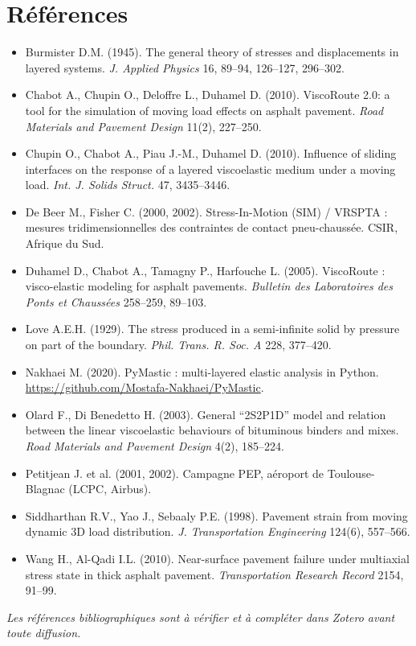 \documentclass[11pt,a4paper]{article}
\begin{document}
\section{Références}
\small
\begin{itemize}[nosep,leftmargin=*]
\item Burmister D.M. (1945). The general theory of stresses and displacements in layered systems. \emph{J. Applied Physics} 16, 89--94, 126--127, 296--302.
\item Chabot A., Chupin O., Deloffre L., Duhamel D. (2010). ViscoRoute 2.0: a tool for the simulation of moving load effects on asphalt pavement. \emph{Road Materials and Pavement Design} 11(2), 227--250.
\item Chupin O., Chabot A., Piau J.-M., Duhamel D. (2010). Influence of sliding interfaces on the response of a layered viscoelastic medium under a moving load. \emph{Int. J. Solids Struct.} 47, 3435--3446.
\item De Beer M., Fisher C. (2000, 2002). Stress-In-Motion (SIM) / VRSPTA : mesures tridimensionnelles des contraintes de contact pneu-chaussée. CSIR, Afrique du Sud.
\item Duhamel D., Chabot A., Tamagny P., Harfouche L. (2005). ViscoRoute : visco-elastic modeling for asphalt pavements. \emph{Bulletin des Laboratoires des Ponts et Chaussées} 258--259, 89--103.
\item Love A.E.H. (1929). The stress produced in a semi-infinite solid by pressure on part of the boundary. \emph{Phil. Trans. R. Soc. A} 228, 377--420.
\item Nakhaei M. (2020). PyMastic : multi-layered elastic analysis in Python. \url{https://github.com/Mostafa-Nakhaei/PyMastic}.
\item Olard F., Di Benedetto H. (2003). General ``2S2P1D'' model and relation between the linear viscoelastic behaviours of bituminous binders and mixes. \emph{Road Materials and Pavement Design} 4(2), 185--224.
\item Petitjean J. et al. (2001, 2002). Campagne PEP, aéroport de Toulouse-Blagnac (LCPC, Airbus).
\item Siddharthan R.V., Yao J., Sebaaly P.E. (1998). Pavement strain from moving dynamic 3D load distribution. \emph{J. Transportation Engineering} 124(6), 557--566.
\item Wang H., Al-Qadi I.L. (2010). Near-surface pavement failure under multiaxial stress state in thick asphalt pavement. \emph{Transportation Research Record} 2154, 91--99.
\end{itemize}
\normalsize
\noindent\emph{Les références bibliographiques sont à vérifier et à compléter dans Zotero avant toute diffusion.}
\end{document}
